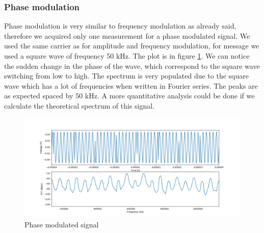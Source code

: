 \documentclass[a4paper,10pt]{article}
\begin{document}
\subsubsection{Phase modulation}
Phase modulation is very similar to frequency modulation as already said, therefore we acquired only one measurement for a phase modulated signal. We used the same carrier as for amplitude and frequency modulation, for message we used a square wave of frequency 50 kHz. The plot is in figure \ref{phase}. We can notice the sudden change in the phase of the wave, which correspond to the square wave switching from low to high. The spectrum is very populated due to the square wave which has a lot of frequencies when written in Fourier series. The peaks are as expected spaced by 50 kHz. A more quantitative analysis could be done if we calculate the theoretical spectrum of this signal.
\begin{figure}[H]
\centering
\includegraphics[width=\textwidth]{phase1}
\caption{Phase modulated signal}\label{phase}
\end{figure}
\end{document}
